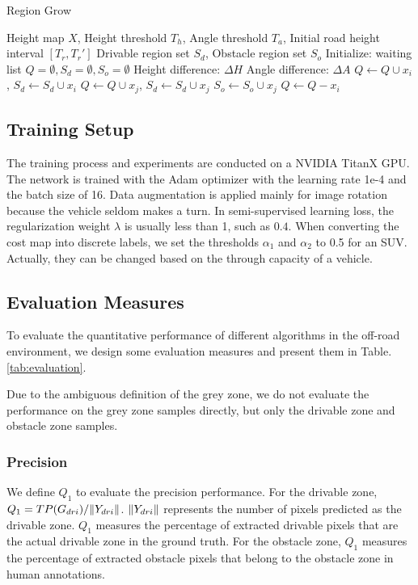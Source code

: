 \documentclass[letterpaper, 10 pt, conference]{ieeeconf}  %
\begin{document}
\begin{algorithm}	
	\caption{Region Grow}
	\label{alg:rg}
	\begin{algorithmic}[1]
		\Require Height map $X$, Height threshold $T_h$, Angle threshold $T_a$, Initial road height interval $[T_r, T_r']$
		\Ensure Drivable region set $S_d$, Obstacle region set $S_o$
		\State Initialize: waiting list $Q=\emptyset,S_d=\emptyset,S_o=\emptyset$
		\State Height difference: $\Delta H$
		\State Angle difference: $\Delta A$
		\State $Q \gets Q \cup x_i$, $S_d \gets S_d \cup x_i$
		\EndIf
		\EndFor
		\State $Q \gets Q \cup x_j$, $S_d \gets S_d \cup x_j$
		\Else
		\State $S_o \gets S_o \cup x_j$
		\EndIf
		\EndFor
		\State $Q \gets Q-x_i$
		\EndWhile
	\end{algorithmic}
\end{algorithm}

\subsection{Training Setup}
The training process and experiments are conducted on a NVIDIA TitanX GPU. The network is trained with the Adam optimizer with the learning rate 1e-4 and the batch size of 16. Data augmentation is applied mainly for image rotation because the vehicle seldom makes a turn. In semi-supervised learning loss, the regularization weight $\lambda$ is usually less than 1, such as $0.4$. When converting the cost map into discrete labels, we set the thresholds $\alpha_1$ and $\alpha_2$ to 0.5 for an SUV. Actually, they can be changed based on the through capacity of a vehicle. 

\subsection{Evaluation Measures}	\label{sec:eval}

To evaluate the quantitative performance of different algorithms in the off-road environment, we design some evaluation measures and present them in Table.\ref{tab:evaluation}. 

Due to the ambiguous definition of the grey zone, we do not evaluate the performance on the grey zone samples directly, but only the drivable zone and obstacle zone samples.

\subsubsection{Precision}
We define $Q_1$ to evaluate the precision performance. For the drivable zone, $Q_1={TP(G_{dri})}/{\Arrowvert Y_{dri} \Arrowvert}$. ${\Arrowvert Y_{dri} \Arrowvert}$ represents the number of pixels predicted as the drivable zone. $Q_1$ measures the percentage of extracted drivable pixels that are the actual drivable zone in the ground truth. For the obstacle zone, $Q_1$ measures the percentage of extracted obstacle pixels that belong to the obstacle zone in human annotations.
\end{document}
